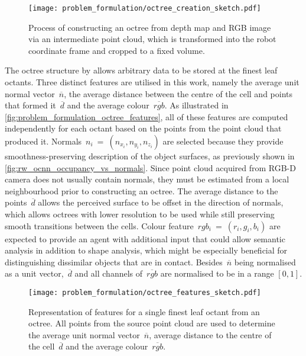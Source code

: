 \begin{figure}[ht]
    \centering
    \texttt{[image: problem\_formulation/octree\_creation\_sketch.pdf]}
    \caption{Process of constructing an octree from depth map and RGB image via an intermediate point cloud, which is transformed into the robot coordinate frame and cropped to a fixed volume.}
    \label{fig:problem_formulation_octree_creation_sketch}
\end{figure}

The octree structure by \citet{wang_o-cnn_2017} allows arbitrary data to be stored at the finest leaf octants. Three distinct features are utilised in this work, namely the average unit normal vector~\(\overline{n}\), the average distance between the centre of the cell and points that formed it~\(\overline{d}\) and the average colour~\(\overline{rgb}\). As illustrated in \autoref{fig:problem_formulation_octree_features}, all of these features are computed independently for each octant based on the points from the point cloud that produced it. Normals~\(n_{i}~{=}~(n_{x_{i}},n_{y_{i}},n_{z_{i}})\) are selected because they provide smoothness-preserving description of the object surfaces, as previously shown in \autoref{fig:rw_ocnn_occupancy_vs_normals}. Since point cloud acquired from RGB-D camera does not usually contain normals, they must be estimated from a local neighbourhood prior to constructing an octree. The average distance to the points~\(\overline{d}\) allows the perceived surface to be offset in the direction of normals, which allows octrees with lower resolution to be used while still preserving smooth transitions between the cells. Colour feature~\(rgb_{i}~{=}~(r_{i},g_{i},b_{i})\) are expected to provide an agent with additional input that could allow semantic analysis in addition to shape analysis, which might be especially beneficial for distinguishing dissimilar objects that are in contact. Besides~\(\overline{n}\) being normalised as a unit vector,~\(\overline{d}\) and all channels of~\(\overline{rgb}\) are normalised to be in a range \([0,1]\).

\begin{figure}[ht]
    \centering
    \texttt{[image: problem\_formulation/octree\_features\_sketch.pdf]}
    \caption{Representation of features for a single finest leaf octant from an octree. All points from the source point cloud are used to determine the average unit normal vector~\(\overline{n}\), average distance to the centre of the cell~\(\overline{d}\) and the average colour~\(\overline{rgb}\).}
    \label{fig:problem_formulation_octree_features}
\end{figure}


